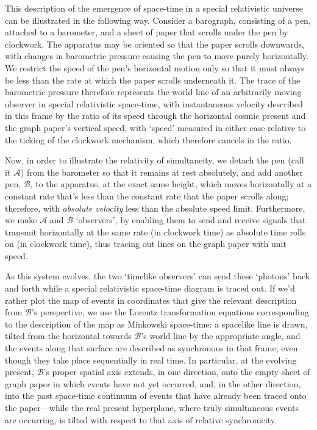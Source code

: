 \documentclass[11pt]{article}
\begin{document}
This description of the emergence of space-time in a special relativistic universe can be illustrated in the following way. Consider a barograph, consisting of a pen, attached to a barometer, and a sheet of paper that scrolls under the pen by clockwork. The apparatus may be oriented so that the paper scrolls downwards, with changes in barometric pressure causing the pen to move purely horizontally. We restrict the speed of the pen's horizontal motion only so that it must always be less than the rate at which the paper scrolls underneath it. The trace of the barometric pressure therefore represents the world line of an arbitrarily moving observer in special relativistic space-time, with instantaneous velocity described in this frame by the ratio of its speed through the horizontal cosmic present and the graph paper's vertical speed, with `speed' measured in either case relative to the ticking of the clockwork mechanism, which therefore cancels in the ratio.

Now, in order to illustrate the relativity of simultaneity, we detach the pen (call it $\mathcal{A}$) from the barometer so that it remains at rest absolutely, and add another pen, $\mathcal{B}$, to the apparatus, at the exact same height, which moves horizontally at a constant rate that's less than the constant rate that the paper scrolls along; therefore, with \textit{absolute velocity} less than the absolute speed limit. Furthermore, we make $\mathcal{A}$ and $\mathcal{B}$ `observers', by enabling them to send and receive signals that transmit horizontally at the same rate (in clockwork time) as absolute time rolls on (in clockwork time), thus tracing out lines on the graph paper with unit speed.

As this system evolves, the two `timelike observers' can send these `photons' back and forth while a special relativistic space-time diagram is traced out. If we'd rather plot the map of events in coordinates that give the relevant description from $\mathcal{B}$'s perspective, we use the Lorentz transformation equations corresponding to the description of the map as Minkowski space-time: a spacelike line is drawn, tilted from the horizontal towards $\mathcal{B}$'s world line by the appropriate angle, and the events along that surface are described as synchronous in that frame, even though they take place sequentially in real time. In particular, at the evolving present, $\mathcal{B}$'s proper spatial axis extends, in one direction, onto the empty sheet of graph paper in which events have not yet occurred, and, in the other direction, into the past space-time continuum of events that have already been traced onto the paper---while the real present hyperplane, where truly simultaneous events are occurring, is tilted with respect to that axis of relative synchronicity.
\end{document}
